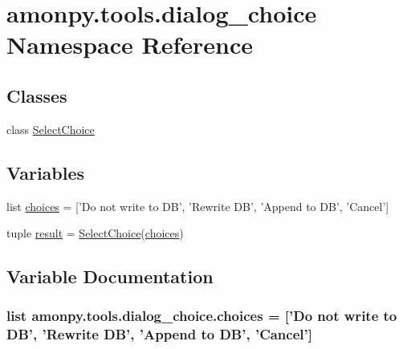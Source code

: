 \hypertarget{namespaceamonpy_1_1tools_1_1dialog__choice}{\section{amonpy.\-tools.\-dialog\-\_\-choice Namespace Reference}
\label{namespaceamonpy_1_1tools_1_1dialog__choice}
}
\subsection*{Classes}
\begin{DoxyCompactItemize}
\item 
class \hyperlink{classamonpy_1_1tools_1_1dialog__choice_1_1_select_choice}{Select\-Choice}
\end{DoxyCompactItemize}
\subsection*{Variables}
\begin{DoxyCompactItemize}
\item 
list \hyperlink{namespaceamonpy_1_1tools_1_1dialog__choice_aa36e2819c2394ac5f1a4b4d9da6b6f45}{choices} = \mbox{[}'Do not write to D\-B', 'Rewrite D\-B', 'Append to D\-B', 'Cancel'\mbox{]}
\item 
tuple \hyperlink{namespaceamonpy_1_1tools_1_1dialog__choice_a4ee52ccd986880002ff77037e4f8f23a}{result} = \hyperlink{classamonpy_1_1tools_1_1dialog__choice_1_1_select_choice}{Select\-Choice}(\hyperlink{namespaceamonpy_1_1tools_1_1dialog__choice_aa36e2819c2394ac5f1a4b4d9da6b6f45}{choices})
\end{DoxyCompactItemize}


\subsection{Variable Documentation}
\hypertarget{namespaceamonpy_1_1tools_1_1dialog__choice_aa36e2819c2394ac5f1a4b4d9da6b6f45}{
\subsubsection[{choices}]{\setlength{\rightskip}{0pt plus 5cm}list amonpy.\-tools.\-dialog\-\_\-choice.\-choices = \mbox{[}'Do not write to D\-B', 'Rewrite D\-B', 'Append to D\-B', 'Cancel'\mbox{]}}}\label{namespaceamonpy_1_1tools_1_1dialog__choice_aa36e2819c2394ac5f1a4b4d9da6b6f45}


